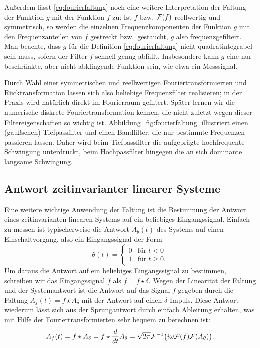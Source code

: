Außerdem lässt \eqref{eq:fourierfaltung} noch eine weitere
Interpretation der Faltung der Funktion $g$ mit der Funktion $f$ zu:
Ist $f$ bzw. $\mathcal F(f)$ reellwertig und symmetrisch, so werden die
einzelnen Frequenzkomponenten der Funktion $g$ mit den
Frequenzanteilen von $f$ gestreckt bzw.\ gestaucht, $g$ also
frequenzgefiltert. Man beachte, dass $g$ für die Definition
\eqref{eq:fourierfaltung} nicht quadratintegrabel sein muss, sofern
der Filter $f$ schnell genug abfällt. Insbesondere kann $g$ eine nur
beschränkte, aber nicht abklingende Funktion sein, wie etwa ein
Messsignal.

Durch Wahl einer symmetrischen und reellwertigen
Fouriertransformierten und Rücktransformation lassen sich also
beliebige Frequenzfilter realisieren; in der Praxis wird natürlich
direkt im Fourierraum gefiltert. Später lernen wir die numerische
diskrete Fouriertransformation kennen, die nicht zuletzt wegen dieser
Filtereigenschaften so wichtig ist. Abbildung~\ref{fig:fourierfaltung}
illustriert einen (gaußschen) Tiefpassfilter und einen Bandfilter, die
nur bestimmte Frequenzen passieren lassen. Daher wird beim
Tiefpassfilter die aufgeprägte hochfrequente Schwingung unterdrückt,
beim Hochpassfilter hingegen die an sich dominante langsame
Schwingung.

\subsection{Antwort zeitinvarianter linearer Systeme}

Eine weitere wichtige Anwendung der Faltung ist die Bestimmung der
Antwort eines zeitinvarianten linearen Systems auf ein beliebiges
Eingangssignal. Einfach zu messen ist typischerweise die Antwort
$A_\theta(t)$ des Systems auf einen Einschaltvorgang, also ein
Eingangssignal der Form
\begin{equation}
  \theta(t) =
  \begin{cases}
    0 & \text{für}\; t < 0\\
    1 & \text{für}\; t \ge 0.
  \end{cases}
\end{equation}
Um daraus die Antwort auf ein beliebiges Eingangssignal zu bestimmen,
schreiben wir das Eingangssignal $f$ als $f = f \star \delta$. Wegen
der Linearität der Faltung und der Systemantwort ist die Antwort auf
das Signal $f$ gegeben durch die Faltung $A_f(t) = f \star A_\delta$
mit der Antwort auf einen $\delta$-Impuls. Diese Antwort wiederum
lässt sich aus der Sprungantwort durch einfach Ableitung erhalten, was
mit Hilfe der Fouriertransformierten sehr bequem zu berechnen ist:
\begin{equation}
  A_f(t) = f \star A_\delta = f \star
  \frac{d}{dt} A_\theta = \sqrt{2\pi} \mathcal F^{-1}\bigl( i\omega \mathcal F(f) \mathcal F(A_\theta)\bigr).
\end{equation}

